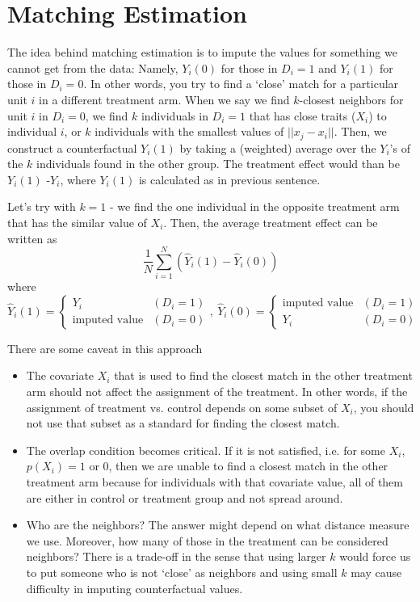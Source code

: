 \section{Matching Estimation}
The idea behind matching estimation is to impute the values for something we cannot get from the data: Namely,  $Y_i(0)$ for those in $D_i=1$ and $Y_i(1)$ for those in $D_i=0$. In other words, you try to find a `close' match for a particular unit $i$ in a different treatment arm. When we say we find $k$-closest neighbors for unit $i$ in $D_i=0$, we find $k$ individuals in $D_i=1$ that has close traits ($X_i$) to individual $i$, or $k$ individuals with the smallest values of $||x_j - x_i||$. Then, we construct a counterfactual $Y_i(1)$ by taking a (weighted) average over the $Y_i$'s of the $k$ individuals found in the other group. The treatment effect would than be $Y_i(1)$ -$Y_i$, where $Y_i(1)$ is calculated as in previous sentence. \par
Let's try with $k=1$ - we find the one individual in the opposite treatment arm that has the similar value of $X_i$. Then, the average treatment effect can be written as
\[
\frac{1}{N}\sum_{i=1}^N(\hat{Y}_i(1)-\hat{Y}_i(0))
\]
where
\[
\hat{Y}_i(1)=\begin{cases} Y_i & (D_i=1) \\ \text{imputed value} & (D_i=0)\end{cases}, \ \hat{Y}_i(0)=\begin{cases} \text{imputed value} & (D_i=1) \\ Y_i & (D_i=0)\end{cases}
\]
\par
There are some caveat in this approach
\begin{itemize}
\item The covariate $X_i$ that is used to find the closest match in the other treatment arm should not affect the assignment of the treatment. In other words, if the assignment of treatment vs. control depends on some subset of $X_i$, you should not use that subset as a standard for finding the closest match.
\item The overlap condition becomes critical. If it is not satisfied, i.e. for some $X_i$, $p(X_i)=1$ or $0$, then we are unable to find a closest match in the other treatment arm because for individuals with that covariate value, all of them are either in control or treatment group and not spread around. 
\item Who are the neighbors? The answer might depend on what distance measure we use. Moreover, how many of those in the treatment can be considered neighbors? There is a trade-off in the sense that using larger $k$ would force us to put someone who is not `close' as neighbors and using small $k$ may cause difficulty in imputing counterfactual values. 
\end{itemize}

